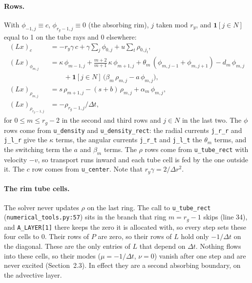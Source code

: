 \documentclass[11pt]{article}
\newcommand{\code}[1]{\texttt{#1}}
\begin{document}
\paragraph{Rows.} With $\phi_{-1,j} \equiv c$, $\phi_{r_g-1,j} \equiv 0$ (the absorbing rim), $j$ taken
mod $r_y$, and $\mathbf{1}[j \in N]$ equal to 1 on the tube rays and 0 elsewhere:
\begin{align*}
(Lx)_c &= -r_y\gamma\, c + \gamma \sum_{j} \phi_{0,j} + u \sum_{t} \rho_{0,j_t}, \\
(Lx)_{\phi_{m,j}} &= \kappa\,\phi_{m-1,j} + \tfrac{m+2}{m+1}\,\kappa\,\phi_{m+1,j}
  + \theta_m\,(\phi_{m,j-1} + \phi_{m,j+1}) - d_m\,\phi_{m,j} \\
  &\qquad + \mathbf{1}[j \in N]\,\bigl(\beta_m\,\rho_{m,j} - a\,\phi_{m,j}\bigr), \\
(Lx)_{\rho_{m,j}} &= s\,\rho_{m+1,j} - (s + b)\,\rho_{m,j} + \alpha_m\,\phi_{m,j}, \\
(Lx)_{\rho_{r_g-1,j}} &= -\rho_{r_g-1,j}/\Delta t,
\end{align*}
for $0 \le m \le r_g - 2$ in the second and third rows and $j \in N$ in the last two.
The $\phi$ rows come from \code{u\_density} and \code{u\_density\_rect}: the radial currents
\code{j\_r\_r} and \code{j\_l\_r} give the $\kappa$ terms, the angular currents \code{j\_r\_t} and
\code{j\_l\_t} the $\theta_m$ terms, and the switching term the $a$ and $\beta_m$ terms. The $\rho$ rows
come from \code{u\_tube\_rect} with velocity $-v$, so transport runs inward and each tube cell is fed by
the one outside it. The $c$ row comes from \code{u\_center}. Note that $r_y\gamma = 2/\Delta r^2$.

\paragraph{The rim tube cells.} The solver never updates $\rho$ on the last ring. The call to
\code{u\_tube\_rect} (\code{numerical\_tools.py:57}) sits in the branch that ring $m = r_g - 1$ skips
(line 34), and \code{A\_LAYER[1]} there keeps the zero it is allocated with, so every step sets these four
cells to 0. Their rows of $P$ are zero, so their rows of $L$ hold only $-1/\Delta t$ on the diagonal.
These are the only entries of $L$ that depend on $\Delta t$. Nothing flows into these cells, so their
modes ($\mu = -1/\Delta t$, $\nu = 0$) vanish after one step and are never excited (Section~2.3). In
effect they are a second absorbing boundary, on the advective layer.
\end{document}
